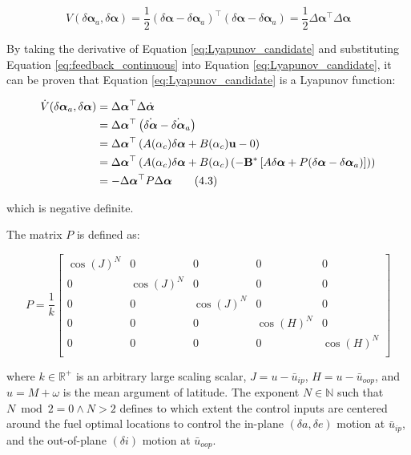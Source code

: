 \begin{equation}
V(\delta \boldsymbol{\alpha}_a, \delta \boldsymbol{\alpha}) = \frac{1}{2} (\delta \boldsymbol{\alpha} - \delta \boldsymbol{\alpha}_a)^\top (\delta \boldsymbol{\alpha} - \delta \boldsymbol{\alpha}_a) 
= \frac{1}{2} \Delta \boldsymbol{\alpha}^\top \Delta \boldsymbol{\alpha}
\label{eq:Lyapunov_candidate}
\end{equation}

By taking the derivative of Equation \ref{eq:Lyapunov_candidate} and substituting Equation \ref{eq:feedback_continuous} into Equation \ref{eq:Lyapunov_candidate}, it can be proven that Equation \ref{eq:Lyapunov_candidate} is a Lyapunov function:

\begin{align}
\dot{V}(\delta \boldsymbol{\alpha}_a, \delta \boldsymbol{\alpha}) 
&= \Delta \boldsymbol{\alpha}^\top \Delta \dot{\boldsymbol{\alpha}} \notag \\
&= \Delta \boldsymbol{\alpha}^\top \left( \dot{\delta \boldsymbol{\alpha}} - \dot{\delta \boldsymbol{\alpha}}_a \right) \notag \\
&= \Delta \boldsymbol{\alpha}^\top \left( A(\alpha_c) \delta \boldsymbol{\alpha} + B(\alpha_c) \mathbf{u} - 0 \right) \notag \\
&= \Delta \boldsymbol{\alpha}^\top \left( A(\alpha_c) \delta \boldsymbol{\alpha} + B(\alpha_c) \left( -\mathbf{B}^* \left[ A \delta \boldsymbol{\alpha} + P(\delta \boldsymbol{\alpha} - \delta \boldsymbol{\alpha}_a) \right] \right) \right) \notag \\
&= -\Delta \boldsymbol{\alpha}^\top P \Delta \boldsymbol{\alpha}
\tag{4.3}
\end{align}

which is negative definite.

The matrix \( P \) is defined as:

\[
P = \frac{1}{k} \begin{bmatrix}
\cos(J)^N & 0 & 0 & 0 & 0 \\
0 & \cos(J)^N & 0 & 0 & 0 \\
0 & 0 & \cos(J)^N & 0 & 0 \\
0 & 0 & 0 & \cos(H)^N & 0 \\
0 & 0 & 0 & 0 & \cos(H)^N \\
\end{bmatrix}
\]

where \( k \in \mathbb{R}^{+} \) is an arbitrary large scaling scalar, 
\( J = u - \bar{u}_{ip} \), \( H = u - \bar{u}_{oop} \), and 
\( u = M + \omega \) is the mean argument of latitude. 
The exponent \( N \in \mathbb{N} \) such that \( N \bmod 2 = 0 \land N > 2 \) 
defines to which extent the control inputs are centered around the fuel optimal locations to control the in-plane \((\delta a, \delta e)\) motion at \( \bar{u}_{ip} \), and the out-of-plane \((\delta i)\) motion at \( \bar{u}_{oop} \).

